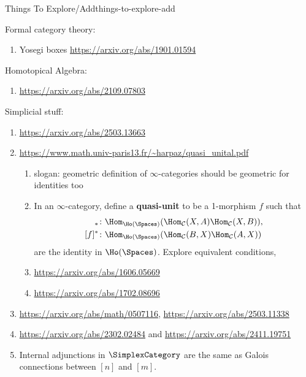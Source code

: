 \begin{remark}{Things To Explore/Add}{things-to-explore-add}
\begin{enumerate}
\begin{enumerate}
\begin{enumerate}
\begin{quote}
                            \end{quote}
                    \end{enumerate}
            \end{enumerate}
    \end{enumerate}
    Formal category theory:
    \begin{enumerate}
        \item Yosegi boxes \url{https://arxiv.org/abs/1901.01594}
    \end{enumerate}
    Homotopical Algebra:
    \begin{enumerate}
        \item \url{https://arxiv.org/abs/2109.07803}
    \end{enumerate}
    Simplicial stuff:
    \begin{enumerate}
        \item \url{https://arxiv.org/abs/2503.13663}
        \item \url{https://www.math.univ-paris13.fr/~harpaz/quasi_unital.pdf}
            \begin{enumerate}
                \item slogan: geometric definition of $\infty$-categories should be geometric for identities too
                \item In an $\infty$-category, define a \textbf{quasi-unit} to be a 1-morphism $f$ such that
                    \begin{align*}
                        [f]_{*} &\colon \Hom_{\Ho(\Spaces)}(\Hom_{\mathcal{C}}(X,A)\Hom_{\mathcal{C}}(X,B)),\\
                        [f]^{*} &\colon \Hom_{\Ho(\Spaces)}(\Hom_{\mathcal{C}}(B,X)\Hom_{\mathcal{C}}(A,X))
                    \end{align*}
                    are the identity in $\Ho(\Spaces)$. Explore equivalent conditions,
                \item \url{https://arxiv.org/abs/1606.05669}
                \item \url{https://arxiv.org/abs/1702.08696}
            \end{enumerate}
        \item \url{https://arxiv.org/abs/math/0507116}, \url{https://arxiv.org/abs/2503.11338}
        \item \url{https://arxiv.org/abs/2302.02484} and \url{https://arxiv.org/abs/2411.19751}
        \item Internal adjunctions in $\SimplexCategory$ are the same as Galois connections between $[n]$ and $[m]$.

\end{enumerate}
\end{remark}
